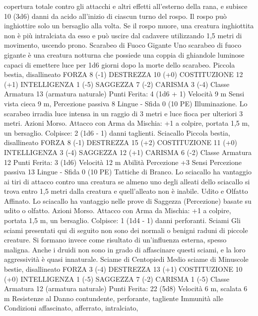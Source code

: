 \begin{multicols}{2}
copertura totale contro gli attacchi e altri effetti all’esterno della
rana, e subisce 10 (3d6) danni da acido all’inizio di ciascun turno
del rospo. Il rospo può inghiottire solo un bersaglio alla volta.
Se il rospo muore, una creatura inghiottita non è più intralciata
da esso e può uscire dal cadavere utilizzando 1,5 metri di
movimento, uscendo prono.
Scarabeo di Fuoco
Gigante
Uno scarabeo di fuoco gigante è una creatura notturna
che possiede una coppia di ghiandole luminose capaci
di emettere luce per 1d6 giorni dopo la morte dello
scarabeo.
Piccola bestia, disallineato
FORZA 8 (-1)
DESTREZZA 10 (+0)
COSTITUZIONE 12 (+1)
INTELLIGENZA 1 (-5)
SAGGEZZA 7 (-2)
CARISMA 3 (-4)
Classe Armatura 13 (armatura naturale)
\hspace*{0pt}\hfill{Punti Ferita}: 4 (1d6 + 1)
Velocità 9 m
Sensi vista cieca 9 m, Percezione passiva 8
Lingue -
Sfida 0 (10 PE)
Illuminazione. Lo scarabeo irradia luce intensa in un raggio di 3
metri e luce fioca per ulteriori 3 metri.
Azioni
Morso. Attacco con Arma da Mischia: +1 a colpire, portata 1,5
m, un bersaglio.
Colpisce: 2 (1d6 - 1) danni taglienti.
Sciacallo
Piccola bestia, disallineato
FORZA 8 (-1)
DESTREZZA 15 (+2)
COSTITUZIONE 11 (+0)
INTELLIGENZA 3 (-4)
SAGGEZZA 12 (+1)
CARISMA 6 (-2)
Classe Armatura 12
\hspace*{0pt}\hfill{Punti Ferita}: 3 (1d6)
Velocità 12 m
Abilità Percezione +3
Sensi Percezione passiva 13
Lingue -
Sfida 0 (10 PE)
Tattiche di Branco. Lo sciacallo ha vantaggio ai tiri di attacco
contro una creatura se almeno uno degli alleati dello sciacallo si
trova entro 1,5 metri dalla creatura e quell’alleato non è inabile.
Udito e Olfatto Affinato. Lo sciacallo ha vantaggio nelle prove
di Saggezza (Percezione) basate su udito o olfatto.
Azioni
Morso. Attacco con Arma da Mischia: +1 a colpire, portata 1,5
m, un bersaglio.
Colpisce: 1 (1d4 - 1) danni perforanti.
Sciami
Gli sciami presentati qui di seguito non sono dei normali
o benigni raduni di piccole creature. Si formano invece
come risultato di un’influenza esterna, spesso maligna.
Anche i druidi non sono in grado di affascinare questi
sciami, e la loro aggressività è quasi innaturale.
Sciame di Centopiedi
Medio sciame di Minuscole bestie, disallineato
FORZA 3 (-4)
DESTREZZA 13 (+1)
COSTITUZIONE 10 (+0)
INTELLIGENZA 1 (-5)
SAGGEZZA 7 (-2)
CARISMA 1 (-5)
Classe Armatura 12 (armatura naturale)
\hspace*{0pt}\hfill{Punti Ferita}: 22 (5d8)
Velocità 6 m, scalata 6 m
Resistenze al Danno contundente, perforante, tagliente
Immunità alle Condizioni affascinato, afferrato, intralciato,

\end{multicols}
